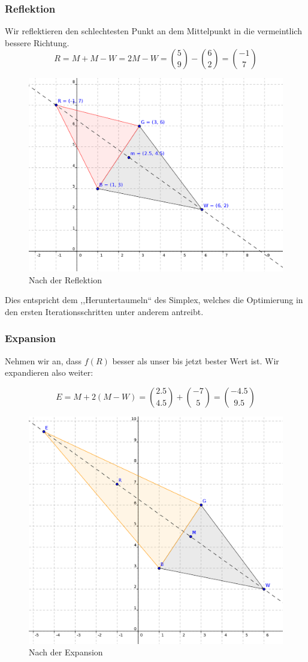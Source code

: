 \documentclass[naustrian]{article}
\begin{document}
\subsubsection{Reflektion}

Wir reflektieren den schlechtesten Punkt an dem Mittelpunkt in die
vermeintlich bessere Richtung.
\[
    R=M+M-W=2M-W=\binom{5}{9}-\binom{6}{2}=\binom{-1}{7}
\]

\begin{figure}[H]
    \centering
    \includegraphics[width=.65\textwidth]{nelder_mead/triangle_reflect}
    \caption{Nach der Reflektion}
\end{figure}

Dies entspricht dem ,,Heruntertaumeln`` des Simplex, welches die
Optimierung in den ersten Iterationsschritten unter anderem antreibt.

\subsubsection{Expansion}

Nehmen wir an, dass $f(R)$ besser als unser bis jetzt bester Wert
ist. Wir expandieren also weiter:

\[
    E=M+2(M-W)=\binom{2.5}{4.5}+\binom{-7}{5}=\binom{-4.5}{9.5}
\]

\begin{figure}[H]
    \centering
    \includegraphics[width=.65\textwidth]{nelder_mead/triangle_expand}
    \caption{Nach der Expansion}
\end{figure}
\end{document}
